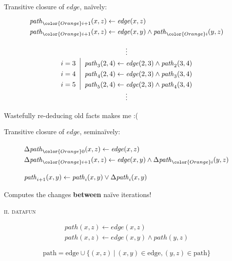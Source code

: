 \documentclass[dvipsnames]{beamer}
\newcommand\D\Delta
\newcommand{\setfor}[2]{\{#1 ~|~ #2\}}
\newcommand\xname[1]{\ensuremath{\mathrm{#1}}}
\newcommand\rel[1]{\ensuremath{\mathit{#1}}}
\newcommand\naive{na\"ive}
\newcommand\hil{\color{Orange}}
\begin{document}
\begin{frame}
  \LARGE
  Transitive closure of \rel{edge}, \naive{}ly:
  \[
  \begin{array}{l}
    \rel{path}_{\hil i+1}(x,z) \leftarrow \rel{edge}(x,z)\\
    \rel{path}_{\hil i+1}(x,z) \leftarrow \rel{edge}(x,y) \wedge \rel{path}_{\hil i}(y,z)
  \end{array}
  \]
\end{frame}

\begin{frame}
  \Large
  \[
  \def\arraystretch{1.3}
  \setlength\arraycolsep{.667em}
  \begin{array}{r|l}
    \multicolumn{2}{c}{\vdots}\\
    i = 3 &
    \rel{path}_3(2,4) \leftarrow \rel{edge}(2,3) \wedge \rel{path}_2(3,4)\\
    i = 4 &
    \rel{path}_4(2,4) \leftarrow \rel{edge}(2,3) \wedge \rel{path}_3(3,4)\\
    i = 5 &
    \rel{path}_5(2,4) \leftarrow \rel{edge}(2,3) \wedge \rel{path}_4(3,4)\\
    \multicolumn{2}{c}{\vdots}
  \end{array}
  \]

  \color{red} Wastefully re-deducing old facts makes me :(
\end{frame}

\begin{frame}
  \Large
  Transitive closure of \rel{edge}, semi\naive{}ly:\vspace{1em}

  \[
  \begin{array}{l}
    \D\rel{path}_{\hil 0}(x,z) \leftarrow \rel{edge}(x,z)\\
    \D\rel{path}_{\hil i+1}(x,z) \leftarrow \rel{edge}(x,y) \wedge \D\rel{path}_{\hil i}(y,z)
    \\[1em]
    \rel{path}_{i+1}(x,y) \leftarrow \rel{path}_i(x,y) \vee \D\rel{path}_i(x,y)
  \end{array}
  \]

  \vspace{1em}
  Computes the changes \textbf{between} \naive{} iterations!
\end{frame}


\begin{frame}
  \Huge\centering\scshape ii. datafun
\end{frame}

\begin{frame}
  \Large
  \[
  \begin{array}{l}
    \rel{path}(x,z) \leftarrow \rel{edge}(x,z)\\
    \rel{path}(x,z) \leftarrow \rel{edge}(x,y) \wedge \rel{path}(y,z)
  \end{array}
  \]

  \[
    \xname{path} = \xname{edge} \cup \setfor{(x,z)}{(x,y) \in \xname{edge}, (y,z) \in \xname{path}}
  \]
\end{frame}
\end{document}

